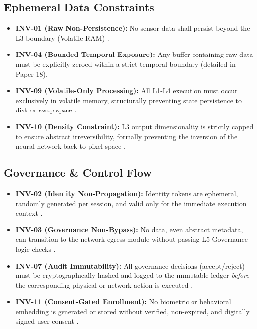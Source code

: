 \documentclass[conference]{IEEEtran}
\begin{document}
\subsection{Ephemeral Data Constraints}
\begin{itemize}
    \item \textbf{INV-01 (Raw Non-Persistence):} No sensor data shall persist beyond the L3 boundary (Volatile RAM) \cite{P17, P18}. 
    \item \textbf{INV-04 (Bounded Temporal Exposure):} Any buffer containing raw data must be explicitly zeroed within a strict temporal boundary (detailed in Paper 18). 
    \item \textbf{INV-09 (Volatile-Only Processing):} All L1-L4 execution must occur exclusively in volatile memory, structurally preventing state persistence to disk or swap space \cite{P12, P18}.
    \item \textbf{INV-10 (Density Constraint):} L3 output dimensionality is strictly capped to ensure abstract irreversibility, formally preventing the inversion of the neural network back to pixel space \cite{P3}.
\end{itemize}

\subsection{Governance \& Control Flow}
\begin{itemize}
    \item \textbf{INV-02 (Identity Non-Propagation):} Identity tokens are ephemeral, randomly generated per session, and valid only for the immediate execution context \cite{P1, P3, P9}.
    \item \textbf{INV-03 (Governance Non-Bypass):} No data, even abstract metadata, can transition to the network egress module without passing L5 Governance logic checks \cite{P9}.
    \item \textbf{INV-07 (Audit Immutability):} All governance decisions (accept/reject) must be cryptographically hashed and logged to the immutable ledger \textit{before} the corresponding physical or network action is executed \cite{P8}.
    \item \textbf{INV-11 (Consent-Gated Enrollment):} No biometric or behavioral embedding is generated or stored without verified, non-expired, and digitally signed user consent \cite{P8}.
\end{itemize}
\end{document}
